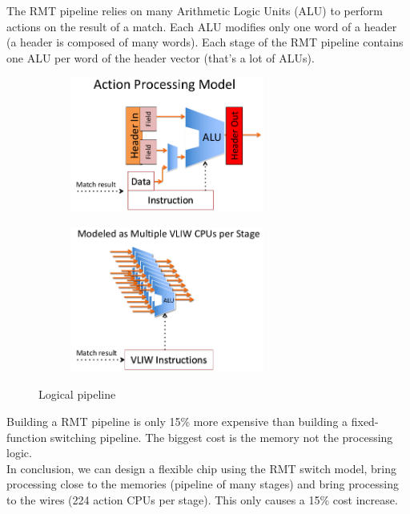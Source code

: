 \documentclass[11pt,oneside,a4paper]{article}
\begin{document}
\newpage

\noindent The RMT pipeline relies on many Arithmetic Logic Units (ALU) to perform actions on the result of a match. Each ALU modifies only one word of a header (a header is composed of many words). Each stage of the RMT pipeline contains one ALU per word of the header vector (that's a lot of ALUs).

\begin{figure}[hb]
	\centering
	\begin{subfigure}[t]{.5\textwidth}
		\centering
		\includegraphics[width=0.7\textwidth,scale=1]{figures/action_processing_model}
		\label{fig:rmt_logical_pipeline}
	\end{subfigure}%
	\begin{subfigure}[t]{.5\textwidth}
		\centering
		\includegraphics[width=0.7\textwidth,scale=1]{figures/multi_action_processing}
		\label{fig:rmt_physical_stages}
	\end{subfigure}
	\caption{Logical pipeline \cite{gibb2013design}}
\end{figure}

\noindent Building a RMT pipeline is only 15\% more expensive than building a fixed-function switching pipeline. The biggest cost is the memory not the processing logic.\\
In conclusion, we can design a flexible chip using the RMT switch model, bring processing close to the memories (pipeline of many stages) and bring processing to the wires (224 action CPUs per stage). This only causes a 15\% cost increase.
\end{document}
